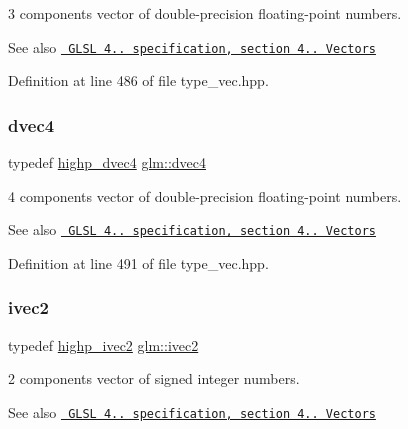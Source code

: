 3 components vector of double-\/precision floating-\/point numbers.

\begin{DoxySeeAlso}{See also}
\href{http://www.opengl.org/registry/doc/GLSLangSpec.4.20.8.pdf}{\texttt{ G\+L\+SL 4.. specification, section 4.. Vectors}} 
\end{DoxySeeAlso}


Definition at line 486 of file type\+\_\+vec.\+hpp.

\mbox{\label{group__core__types_ga0824ceed7ec3b2fba89765501c1540b5}} 
\subsubsection{\texorpdfstring{dvec4}{dvec4}}
{\footnotesize\ttfamily typedef \mbox{\hyperlink{group__core__precision_ga2bb20b4bd180746b93577bc57f4b2b9d}{highp\+\_\+dvec4}} \mbox{\hyperlink{group__core__types_ga0824ceed7ec3b2fba89765501c1540b5}{glm\+::dvec4}}}

4 components vector of double-\/precision floating-\/point numbers.

\begin{DoxySeeAlso}{See also}
\href{http://www.opengl.org/registry/doc/GLSLangSpec.4.20.8.pdf}{\texttt{ G\+L\+SL 4.. specification, section 4.. Vectors}} 
\end{DoxySeeAlso}


Definition at line 491 of file type\+\_\+vec.\+hpp.

\mbox{\label{group__core__types_ga9e6ce9cfc7919976b318197e18d8a065}} 
\subsubsection{\texorpdfstring{ivec2}{ivec2}}
{\footnotesize\ttfamily typedef \mbox{\hyperlink{group__core__precision_ga01acd79fbbe3d93a532276586b5c39ee}{highp\+\_\+ivec2}} \mbox{\hyperlink{group__core__types_ga9e6ce9cfc7919976b318197e18d8a065}{glm\+::ivec2}}}

2 components vector of signed integer numbers.

\begin{DoxySeeAlso}{See also}
\href{http://www.opengl.org/registry/doc/GLSLangSpec.4.20.8.pdf}{\texttt{ G\+L\+SL 4.. specification, section 4.. Vectors}} 
\end{DoxySeeAlso}


